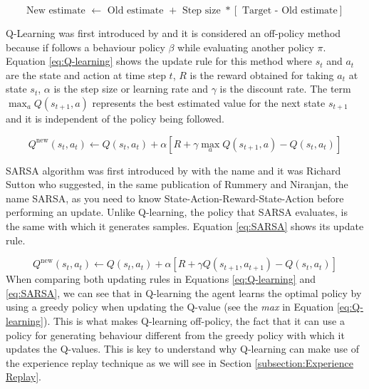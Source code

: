 \begin{equation}
\text{New estimate } \leftarrow \text{ Old estimate }+ \text{ Step size }* \left[\text{ Target - Old estimate} \right]
\label{eq:TD}
\end{equation}

Q-Learning was first introduced by \cite{Watkins:1989} and it is considered an off-policy method because if follows a behaviour policy $\beta$ while evaluating another policy $\pi$. Equation \eqref{eq:Q-learning} shows the update rule for this method where $s_t$ and $a_t$ are the state and action at time step $t$, $R$ is the reward obtained for taking $a_t$ at state $s_t$, $\alpha$ is the step size or learning rate and $\gamma$ is  the discount rate. The term $\max_{a} Q(s_{t+1}, a)$ represents  the best estimated value for the next state $s_{t+1}$ and it is independent of the policy being followed.

\begin{equation}
Q^{\text{new}}(s_t, a_t)  \leftarrow Q(s_t, a_t) + \alpha \left[ R  + \gamma {\max_{a} Q(s_{t+1}, a)} - Q(s_t, a_t)\right]
\label{eq:Q-learning}
\end{equation}


SARSA algorithm was first introduced by \cite{Rummery+Niranjan:1994} with the name  and it was Richard Sutton who suggested, in the same publication of Rummery and Niranjan, the name SARSA, as you need to know State-Action-Reward-State-Action before performing an update.  Unlike Q-learning, the policy that SARSA evaluates, is the same with which it generates samples. Equation \eqref{eq:SARSA} shows its update rule.

\begin{equation}
Q^{\text{new}}(s_t, a_t)  \leftarrow Q(s_t, a_t) + \alpha \left[R+ \gamma  Q(s_{t+1}, a_{t+1}) - Q(s_t, a_t)\right]
\label{eq:SARSA}
\end{equation}
When comparing both updating rules in Equations \eqref{eq:Q-learning} and \ref{eq:SARSA}, we can see that in Q-learning the agent learns the optimal policy by using a greedy policy when updating the Q-value (see the \textit{max} in Equation \eqref{eq:Q-learning}). This is what makes Q-learning off-policy, the fact that it can use a policy for generating behaviour different from the greedy policy with which it updates the Q-values. This is key to understand why Q-learning can make use of the experience replay technique as we will see in Section \ref{subsection:Experience Replay}.



